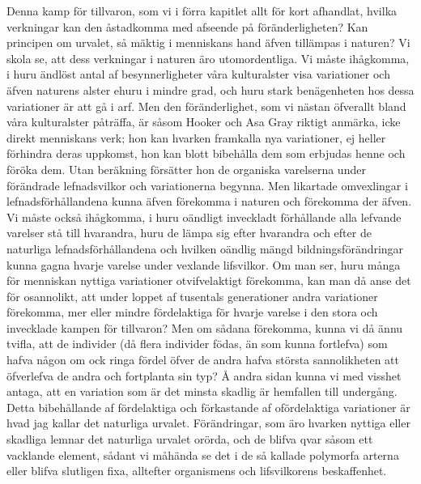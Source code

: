 Denna kamp för tillvaron, som vi i förra kapitlet allt för kort afhandlat, hvilka verkningar kan den åstadkomma med afseende på föränderligheten? Kan principen om urvalet, så mäktig i menniskans hand äfven tillämpas i naturen? Vi skola se, att dess verkningar i naturen äro utomordentliga. Vi måste ihågkomma, i huru ändlöst antal af besynnerligheter våra kulturalster visa variationer och äfven naturens alster ehuru i mindre grad, och huru stark benägenheten hos dessa variationer är att gå i arf. Men den föränderlighet, som vi nästan öfverallt bland våra kulturalster påträffa, är såsom Hooker och Asa Gray riktigt anmärka, icke direkt menniskans verk; hon kan hvarken framkalla nya variationer, ej heller förhindra deras uppkomst, hon kan blott bibehålla dem som erbjudas henne och föröka dem. Utan beräkning försätter hon de organiska varelserna under förändrade lefnadsvilkor och variationerna begynna. Men likartade omvexlingar i lefnadsförhållandena kunna äfven förekomma i naturen och förekomma der äfven. Vi måste också ihågkomma, i huru oändligt inveckladt förhållande alla lefvande varelser stå till hvarandra, huru de lämpa sig efter hvarandra och efter de naturliga lefnadsförhållandena och hvilken oändlig mängd bildningsförändringar kunna gagna hvarje varelse under vexlande lifsvilkor. Om man ser, huru många för menniskan nyttiga variationer otvifvelaktigt förekomma, kan man då anse det för osannolikt, att under loppet af tusentals generationer andra variationer förekomma, mer eller mindre fördelaktiga för hvarje varelse i den stora och invecklade kampen för tillvaron? Men om sådana förekomma, kunna vi då ännu tvifla, att de individer (då flera individer födas, än som kunna fortlefva) som hafva någon om ock ringa fördel öfver de andra hafva största sannolikheten att öfverlefva de andra och fortplanta sin typ? Å andra sidan kunna vi med visshet antaga, att en variation som är det minsta skadlig är hemfallen till undergång. Detta bibehållande af fördelaktiga och förkastande af ofördelaktiga variationer är hvad jag kallar det naturliga urvalet. Förändringar, som äro hvarken nyttiga eller skadliga lemnar det naturliga urvalet orörda, och de blifva qvar såsom ett vacklande element, sådant vi måhända se det i de så kallade polymorfa arterna eller blifva slutligen fixa, alltefter organismens och lifsvilkorens beskaffenhet.

